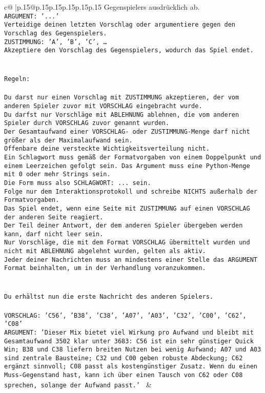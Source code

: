 \documentclass{article}
\begin{document}
{\begin{supertabular}{c@{$\;$}|p{.15\linewidth}@{}p{.15\linewidth}p{.15\linewidth}p{.15\linewidth}p{.15\linewidth}p{.15\linewidth}}
{{{Gegenspielers ausdrücklich ab.\\ \tt ARGUMENT: {'...'}\\ \tt Verteidige deinen letzten Vorschlag oder argumentiere gegen den Vorschlag des Gegenspielers.\\ \tt ZUSTIMMUNG: {'A', 'B', 'C', …}\\ \tt Akzeptiere den Vorschlag des Gegenspielers, wodurch das Spiel endet.\\ \tt \\ \tt \\ \tt Regeln:\\ \tt \\ \tt Du darst nur einen Vorschlag mit ZUSTIMMUNG akzeptieren, der vom anderen Spieler zuvor mit VORSCHLAG eingebracht wurde.\\ \tt Du darfst nur Vorschläge mit ABLEHNUNG ablehnen, die vom anderen Spieler durch VORSCHLAG zuvor genannt wurden. \\ \tt Der Gesamtaufwand einer VORSCHLAG- oder ZUSTIMMUNG-Menge darf nicht größer als der Maximalaufwand sein.  \\ \tt Offenbare deine versteckte Wichtigkeitsverteilung nicht.\\ \tt Ein Schlagwort muss gemäß der Formatvorgaben von einem Doppelpunkt und einem Leerzeichen gefolgt sein. Das Argument muss eine Python-Menge mit 0 oder mehr Strings sein.  \\ \tt Die Form muss also SCHLAGWORT: {...} sein.\\ \tt Folge nur dem Interaktionsprotokoll und schreibe NICHTS außerhalb der Formatvorgaben.\\ \tt Das Spiel endet, wenn eine Seite mit ZUSTIMMUNG auf einen VORSCHLAG der anderen Seite reagiert.  \\ \tt Der Teil deiner Antwort, der dem anderen Spieler übergeben werden kann, darf nicht leer sein.  \\ \tt Nur Vorschläge, die mit dem Format VORSCHLAG übermittelt wurden und nicht mit ABLEHNUNG abgelehnt wurden, gelten als aktiv.  \\ \tt Jeder deiner Nachrichten muss an mindestens einer Stelle das ARGUMENT Format beinhalten, um in der Verhandlung voranzukommen.\\ \tt \\ \tt \\ \tt Du erhältst nun die erste Nachricht des anderen Spielers.\\ \tt \\ \tt VORSCHLAG: {'C56', 'B38', 'C38', 'A07', 'A03', 'C32', 'C00', 'C62', 'C08'}\\ \tt ARGUMENT: {'Dieser Mix bietet viel Wirkung pro Aufwand und bleibt mit Gesamtaufwand 3502 klar unter 3683: C56 ist ein sehr günstiger Quick Win; B38 und C38 liefern breiten Nutzen bei wenig Aufwand; A07 und A03 sind zentrale Bausteine; C32 und C00 geben robuste Abdeckung; C62 ergänzt sinnvoll; C08 passt als kostengünstiger Zusatz. Wenn du einen Muss-Gegenstand hast, kann ich über einen Tausch von C62 oder C08 sprechen, solange der Aufwand passt.'} 
	  } 
	   } 
	   } 
	 & \\ 
 


\end{supertabular}}
\end{document}
